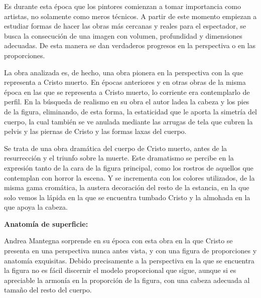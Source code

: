Es durante esta época que los pintores comienzan a tomar importancia como artistas, no solamente como meros técnicos. A partir de este momento empiezan a estudiar formas de hacer las obras más cercanas y reales para el espectador, se busca la consecución de una imagen con volumen, profundidad y dimensiones adecuadas. De esta manera se dan verdaderos progresos en la perspectiva o en las proporciones.

La obra analizada es, de hecho, una obra pionera en la perspectiva con la que representa a Cristo muerto. En épocas anteriores y en otras obras de la misma época en las que se representa a Cristo muerto, lo corriente era contemplarlo de perfil. En la búsqueda de realismo en su obra el autor ladea la cabeza y los pies de la figura, eliminando, de esta forma, la estaticidad que le aporta la simetría del cuerpo, la cual también se ve anulada mediante las arrugas de tela que cubren la pelvis y las piernas de Cristo y las formas laxas del cuerpo.

Se trata de una obra dramática del cuerpo de Cristo muerto, antes de la resurrección y el triunfo sobre la muerte. Este dramatismo se percibe en la expresión tanto de la cara de la figura principal, como los rostros de aquellos que contemplan con horror la escena. Y se incrementa con los colores utilizados, de la misma gama cromática, la austera decoración del resto de la estancia, en la que solo vemos la lápida en la que se encuentra tumbado Cristo y la almohada en la que apoya la cabeza.



\vspace{12pt}
\textbf{Anatomía de superficie:}

Andrea Mantegna sorprende en su época con esta obra en la que Cristo se presenta en una perspectiva nunca antes vista, y con una figura de proporciones y anatomía exquisitas. Debido precisamente a la perspectiva en la que se encuentra la figura no es fácil discernir el modelo proporcional que sigue, aunque si es apreciable la armonía en la proporción de la figura, con una cabeza adecuada al tamaño del resto del cuerpo.

